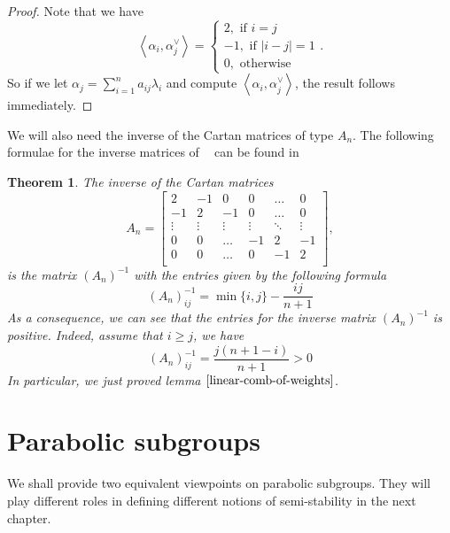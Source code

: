 \documentclass[12pt]{article} %
\newtheorem{theorem}[definition]{Theorem}
\DeclareMathOperator{\slnr}{\mathfrak{sl}_n(\mathbb{R})}
\begin{document}
\begin{proof}
    Note that we have
    \[\left\langle \alpha_i,\alpha_j^{\vee}\right\rangle = \begin{cases}
            2, \mbox{ if } i =j     \\
            -1, \mbox{ if } |i-j|=1 \\
            0, \mbox{ otherwise }
        \end{cases}. \]
    So if we let $\alpha_j = \sum_{i=1}^n a_{ij}\lambda_i$ and compute $\left\langle \alpha_i,\alpha_j^{\vee}\right\rangle$, the result follows immediately.
\end{proof}
We will also need the inverse of the Cartan matrices of type $A_n$. The following formulae for the
inverse matrices of $\slnr$ can be found in \cite{}
\begin{theorem}
    The inverse of the Cartan matrices
    \[A_n = \begin{bmatrix}
            2      & -1     & 0      & 0      & \ldots & 0      \\
            -1     & 2      & -1     & 0      & \ldots & 0      \\
            \vdots & \vdots & \vdots & \vdots & \ddots & \vdots \\
            0      & 0      & \ldots & -1     & 2      & -1     \\
            0      & 0      & \ldots & 0      & -1     & 2      \\
        \end{bmatrix},\]
    is the matrix $(A_n)^{-1}$ with the entries given by the following formula
    \[(A_n)^{-1}_{ij} = \min\{i,j\}-\dfrac{ij}{n+1}\]
    As a consequence, we can see that the entries for the inverse matrix $(A_n)^{-1}$ is positive. Indeed, assume that
    $i \ge j$, we have
    \[(A_n)^{-1}_{ij} = \dfrac{j(n+1-i)}{n+1}>0\]
    In particular, we just proved lemma $\ref{linear-comb-of-weights}$.
\end{theorem}
\section{Parabolic subgroups}
We shall provide two equivalent viewpoints on parabolic subgroups. They will play different roles in defining
different notions of semi-stability in the next chapter.
\end{document}
